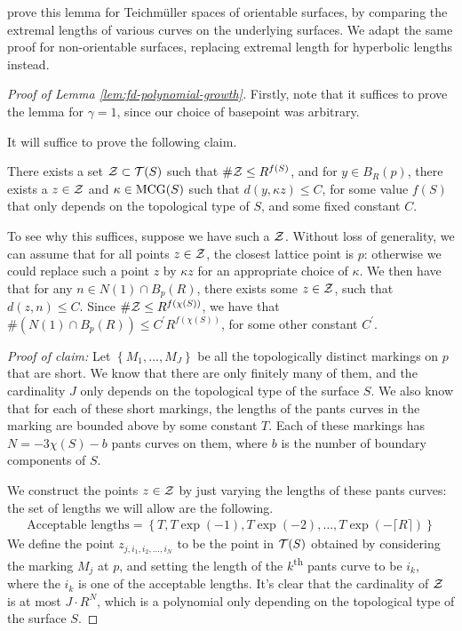 \documentclass[12pt, reqno]{amsart}
\begin{document}
\begin{rem}
  \textcite[Lemma 3.2]{eskinmirzakhani} prove this lemma for Teichmüller spaces of orientable surfaces, by comparing the extremal lengths of various curves on the underlying surfaces.
  We adapt the same proof for non-orientable surfaces, replacing extremal length for hyperbolic lengths instead.
\end{rem}

\begin{proof}[Proof of Lemma \ref{lem:fd-polynomial-growth}]
  Firstly, note that it suffices to prove the lemma for $\gamma = 1$, since our choice of basepoint was arbitrary.

  It will suffice to prove the following claim.
  \begin{claim*}
  There exists a set $\mathcal{Z} \subset \mathcal{T}(S)$ such that $\# \mathcal{Z} \leq R^{f(S)}$, and for $y \in B_R(p)$, there exists a $z \in \mathcal{Z}$ and $\kappa \in \mathrm{MCG}(S)$ such that $d(y, \kappa z) \leq C$, for some value $f(S)$ that only depends on the topological type of $S$, and some fixed constant $C$.
  \end{claim*}
  To see why this suffices, suppose we have such a $\mathcal{Z}$.
  Without loss of generality, we can assume that for all points $z \in \mathcal{Z}$, the closest lattice point is $p$: otherwise we could replace such a point $z$ by $\kappa z$ for an appropriate choice of $\kappa$.
We then have that for any $n \in N(1) \cap B_p(R)$, there exists some $z \in \mathcal{Z}$, such that $d(z, n) \leq C$.
Since $\# \mathcal{Z} \leq R^{f(\chi(S))}$, we have that $\#\left( N(1) \cap B_p(R) \right) \leq C^{\prime} R^{f(\chi(S))}$, for some other constant $C^{\prime}$.

\emph{Proof of claim:}
  Let $\left\{ M_1, \ldots, M_J \right\}$ be all the topologically distinct markings on $p$ that are short.
  We know that there are only finitely many of them, and the cardinality $J$ only depends on the topological type of the surface $S$.
  We also know that for each of these short markings, the lengths of the pants curves in the marking are bounded above by some constant $T$.
  Each of these markings has $N = -3 \chi(S) - b$ pants curves on them, where $b$ is the number of boundary components of $S$.

  We construct the points $z \in \mathcal{Z}$ by just varying the lengths of these pants curves: the set of lengths we will allow are the following.
  \begin{align*}
    \text{Acceptable lengths} = \left\{ T, T \exp(-1), T\exp(-2), \ldots, T \exp(-\lceil R \rceil) \right\}
  \end{align*}
  We define the point $z_{j, i_1, i_2, \ldots , i_N}$ to be the point in $\mathcal{T}(S)$ obtained by considering the marking $M_j$ at $p$, and setting the length of the $k$\textsuperscript{th} pants curve to be $i_k$, where the $i_k$ is one of the acceptable lengths.
  It's clear that the cardinality of $\mathcal{Z}$ is at most $J \cdot R^N$, which is a polynomial only depending on the topological type of the surface $S$.


\end{proof}
\end{document}
